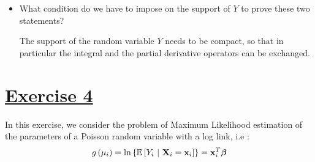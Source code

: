 \documentclass[a4paper,12pt]{article}
\def\bx{\mathbf{x}}
\def\bbeta{\mbox{\boldmath $\beta$}}
\def\bX{\mathbf{X}}
\def\op{\left(}
\def\cp{\right)}
\def\oc{\left[}
\def\cc{\right]}
\def\ok{\left\{}
\def\ck{\right\}}
\def\exE{\mathbb{E}}
\begin{document}
\begin{itemize}
\begin{enumerate}
{\begin{align*}
          f(Y;\theta) \frac{\partial^2}{\partial \theta^2} f(Y;\theta) - \op \frac{\partial}{\partial \theta} f(Y;\theta)\cp^2\cc \ck \\
          &= 
          \exE\oc\frac{1}{f(Y;\theta)} \frac{\partial^2}{\partial \theta^2} f(Y;\theta)\cc
          -
          \exE\oc \frac{1}{f(Y;\theta)} \frac{\partial}{\partial \theta} f(Y;\theta) \cc^2 \\
          &= 
          \int \frac{\partial^2}{\partial \theta^2} f(y;\theta) \ \mathrm{d}y 
          -
          \exE\oc \frac{\partial}{\partial \theta} \log f(Y;\theta) \cc^2 \\
          &= 
          \frac{\partial^2}{\partial \theta^2} \int f(y;\theta) \ \mathrm{d}y - 
          \exE\oc U^2(\theta;Y)\cc 
           \\
          \exE\oc\frac{\partial U(\theta;Y)}{ \partial \theta}\cc  &= -\exE\oc U^2(\theta;Y)\cc
   \end{align*}
      } 
\end{enumerate}

\item What condition do we have to impose on the support of $Y$ to prove these two statements?

{\color{blue}
  The support of the random variable $Y$ needs to be compact, so that in particular the integral  and the partial derivative operators can be exchanged. 
}
\end{itemize}

\section{\underline{Exercise 4}}

In this exercise, we consider the problem of Maximum Likelihood estimation of the parameters of a Poisson random variable with a log link, i.e : 
\begin{equation*}
    g\op\mu_i\cp = \mathrm{ln}\ok \exE \oc Y_i \ | \ \bX_i = \bx_i  \cc\ck = \bx_i^T\bbeta
\end{equation*}
\end{document}
